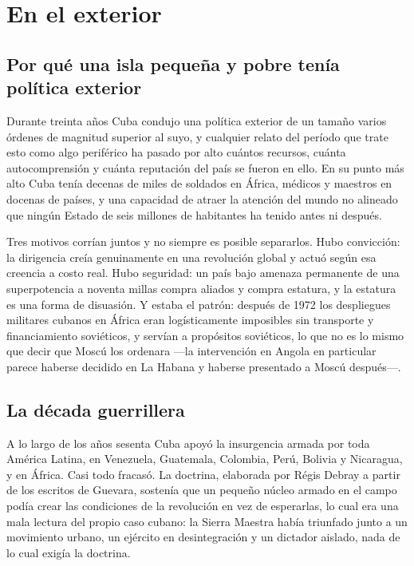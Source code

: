 \chapter{En el exterior}
\label{ch:internationalism}

\section{Por qué una isla pequeña y pobre tenía política exterior}

Durante treinta años Cuba condujo una política exterior de un tamaño varios
órdenes de magnitud superior al suyo, y cualquier relato del período que trate
esto como algo periférico ha pasado por alto cuántos recursos, cuánta
autocomprensión y cuánta reputación del país se fueron en ello. En su punto más
alto Cuba tenía decenas de miles de soldados en África, médicos y maestros en
docenas de países, y una capacidad de atraer la atención del mundo no alineado
que ningún Estado de seis millones de habitantes ha tenido antes ni después.

Tres motivos corrían juntos y no siempre es posible separarlos. Hubo convicción:
la dirigencia creía genuinamente en una revolución global y actuó según esa
creencia a costo real. Hubo seguridad: un país bajo amenaza permanente de una
superpotencia a noventa millas compra aliados y compra estatura, y la estatura es
una forma de disuasión. Y estaba el patrón: después de 1972 los despliegues
militares cubanos en África eran logísticamente imposibles sin transporte y
financiamiento soviéticos, y servían a propósitos soviéticos, lo que no es lo
mismo que decir que Moscú los ordenara ---la intervención en Angola en particular
parece haberse decidido en La Habana y haberse presentado a Moscú después---.

\section{La década guerrillera}

A lo largo de los años sesenta Cuba apoyó la insurgencia armada por toda América
Latina, en Venezuela, Guatemala, Colombia, Perú, Bolivia y Nicaragua, y en
África. Casi todo fracasó. La doctrina, elaborada por Régis Debray a partir de
los escritos de Guevara, sostenía que un pequeño núcleo armado en el campo podía
crear las condiciones de la revolución en vez de esperarlas, lo cual era una
mala lectura del propio caso cubano: la Sierra Maestra había triunfado junto a un
movimiento urbano, un ejército en desintegración y un dictador aislado, nada de
lo cual exigía la doctrina.

